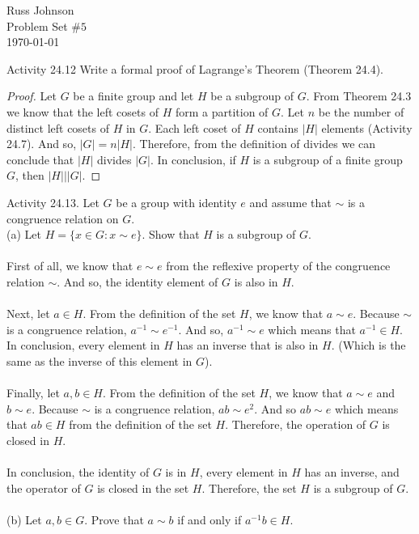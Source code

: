 \documentclass[11pt,a4paper]{article}
\begin{document}
\begin{flushright}
Russ Johnson\\
Problem Set $\#5$\\
\today\\
\end{flushright}

Activity 24.12 Write a formal proof of Lagrange's Theorem (Theorem 24.4).
\begin{proof}
Let $G$ be a finite group and let $H$ be a subgroup of $G$. From Theorem 24.3 we know that the left cosets of $H$ form a partition of $G$. Let $n$ be the number of distinct left cosets of $H$ in $G$. Each left coset of $H$ contains $|H|$ elements (Activity 24.7). And so, $|G| = n|H|$. Therefore, from the definition of divides we can conclude that $|H|$ divides $|G|$. In conclusion, if $H$ is a subgroup of a finite group $G$, then $|H|||G|$.
\end{proof}
Activity 24.13. Let $G$ be a group with identity $e$ and assume that $\sim$ is a congruence relation on $G$.\\
(a) Let $H = \{x \in G : x \sim e\}$. Show that $H$ is a subgroup of $G$.\\
~\\
First of all, we know that $e\sim e$ from the reflexive property of the congruence relation $\sim$. And so, the identity element of $G$ is also in $H$.\\
~\\
Next, let $a\in H$. From the definition of the set $H$, we know that $a\sim e$. Because $\sim$ is a congruence relation,  $a^{-1} \sim e^{-1} $. And so, $a^{-1} \sim e$ which means that $a^{-1}\in H$. In conclusion, every element in $H$ has an inverse that is also in $H$. (Which is the same as the inverse of this element in $G$).\\
~\\
Finally, let $a,b\in H$. From the definition of the set $H$, we know that $a\sim e$ and $b\sim e$. Because $\sim$ is a congruence relation,  $ab \sim e^2 $. And so $ab \sim e$ which means that $ab\in H$ from the definition of the set $H$. Therefore, the operation of $G$ is closed in $H$.\\
~\\
In conclusion, the identity of $G$ is in $H$, every element in $H$ has an inverse, and the operator of $G$ is closed in the set $H$. Therefore, the set $H$ is a subgroup of $G$.\\
~\\
(b) Let $a, b \in G$. Prove that $a \sim b$ if and only if $a^{-1} b \in H$.\\
\end{document}
